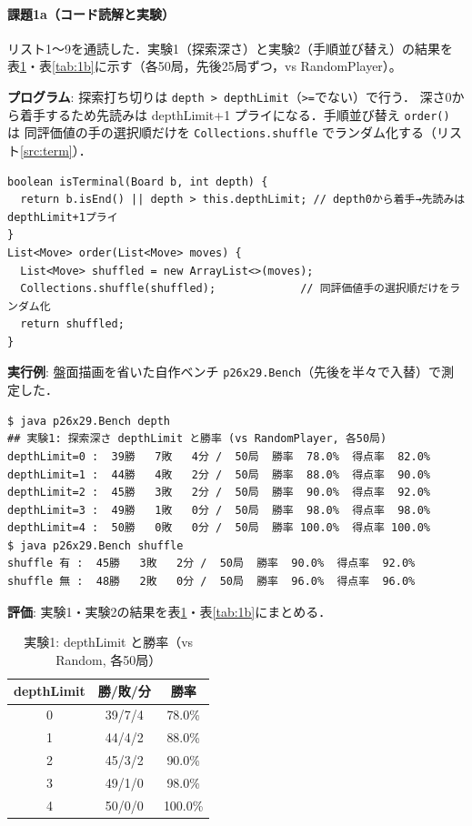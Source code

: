 \documentclass[11pt,a4j]{ujarticle} %
\begin{document}
\paragraph{課題1a（コード読解と実験）}
リスト1〜9を通読した．実験1（探索深さ）と実験2（手順並び替え）の結果を
表\ref{tab:1a}・表\ref{tab:1b}に示す（各50局，先後25局ずつ，vs RandomPlayer）。

\textbf{プログラム}: 探索打ち切りは {\verb+depth > depthLimit+}（{\verb+>=+}でない）で行う．
深さ0から着手するため先読みは depthLimit+1 プライになる．手順並び替え {\verb+order()+} は
同評価値の手の選択順だけを {\verb+Collections.shuffle+} でランダム化する（リスト\ref{src:term}）．
\begin{lstlisting}[caption=探索打ち切りと手順並び替え（MyPlayer）,label=src:term]
boolean isTerminal(Board b, int depth) {
  return b.isEnd() || depth > this.depthLimit; // depth0から着手→先読みはdepthLimit+1プライ
}
List<Move> order(List<Move> moves) {
  List<Move> shuffled = new ArrayList<>(moves);
  Collections.shuffle(shuffled);             // 同評価値手の選択順だけをランダム化
  return shuffled;
}
\end{lstlisting}

\textbf{実行例}: 盤面描画を省いた自作ベンチ {\verb+p26x29.Bench+}（先後を半々で入替）で測定した．
\begin{lstlisting}[caption=実験1・実験2の実行例,label=ex:1a]
$ java p26x29.Bench depth
## 実験1: 探索深さ depthLimit と勝率 (vs RandomPlayer, 各50局)
depthLimit=0 :  39勝   7敗   4分 /  50局  勝率  78.0%  得点率  82.0%
depthLimit=1 :  44勝   4敗   2分 /  50局  勝率  88.0%  得点率  90.0%
depthLimit=2 :  45勝   3敗   2分 /  50局  勝率  90.0%  得点率  92.0%
depthLimit=3 :  49勝   1敗   0分 /  50局  勝率  98.0%  得点率  98.0%
depthLimit=4 :  50勝   0敗   0分 /  50局  勝率 100.0%  得点率 100.0%
$ java p26x29.Bench shuffle
shuffle 有 :  45勝   3敗   2分 /  50局  勝率  90.0%  得点率  92.0%
shuffle 無 :  48勝   2敗   0分 /  50局  勝率  96.0%  得点率  96.0%
\end{lstlisting}

\textbf{評価}: 実験1・実験2の結果を表\ref{tab:1a}・表\ref{tab:1b}にまとめる．

\begin{table}[h]\center
\caption{実験1: depthLimit と勝率（vs Random, 各50局）}\label{tab:1a}
\begin{tabular}{c|c|c}
depthLimit & 勝/敗/分 & 勝率 \\ \hline\hline
0 & 39/7/4 & 78.0\% \\
1 & 44/4/2 & 88.0\% \\
2 & 45/3/2 & 90.0\% \\
3 & 49/1/0 & 98.0\% \\
4 & 50/0/0 & 100.0\% \\
\end{tabular}
\end{table}
\end{document}
